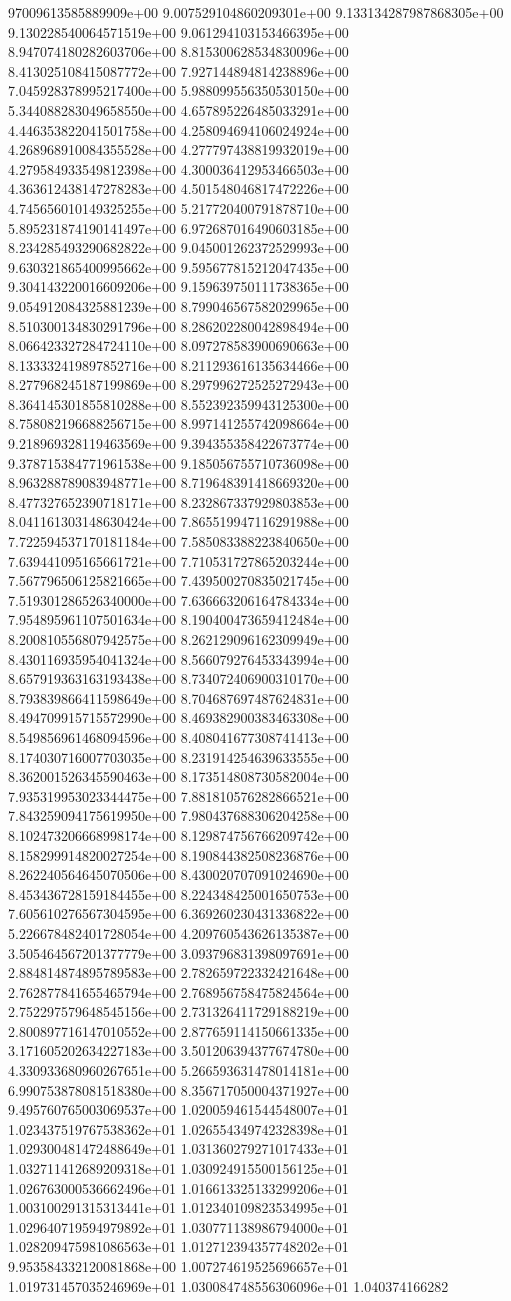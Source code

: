 97009613585889909e+00	9.007529104860209301e+00	9.133134287987868305e+00	9.130228540064571519e+00	9.061294103153466395e+00	8.947074180282603706e+00	8.815300628534830096e+00	8.413025108415087772e+00	7.927144894814238896e+00	7.045928378995217400e+00	5.988099556350530150e+00	5.344088283049658550e+00	4.657895226485033291e+00	4.446353822041501758e+00	4.258094694106024924e+00	4.268968910084355528e+00	4.277797438819932019e+00	4.279584933549812398e+00	4.300036412953466503e+00	4.363612438147278283e+00	4.501548046817472226e+00	4.745656010149325255e+00	5.217720400791878710e+00	5.895231874190141497e+00	6.972687016490603185e+00	8.234285493290682822e+00	9.045001262372529993e+00	9.630321865400995662e+00	9.595677815212047435e+00	9.304143220016609206e+00	9.159639750111738365e+00	9.054912084325881239e+00	8.799046567582029965e+00	8.510300134830291796e+00	8.286202280042898494e+00	8.066423327284724110e+00	8.097278583900690663e+00	8.133332419897852716e+00	8.211293616135634466e+00	8.277968245187199869e+00	8.297996272525272943e+00	8.364145301855810288e+00	8.552392359943125300e+00	8.758082196688256715e+00	8.997141255742098664e+00	9.218969328119463569e+00	9.394355358422673774e+00	9.378715384771961538e+00	9.185056755710736098e+00	8.963288789083948771e+00	8.719648391418669320e+00	8.477327652390718171e+00	8.232867337929803853e+00	8.041161303148630424e+00	7.865519947116291988e+00	7.722594537170181184e+00	7.585083388223840650e+00	7.639441095165661721e+00	7.710531727865203244e+00	7.567796506125821665e+00	7.439500270835021745e+00	7.519301286526340000e+00	7.636663206164784334e+00	7.954895961107501634e+00	8.190400473659412484e+00	8.200810556807942575e+00	8.262129096162309949e+00	8.430116935954041324e+00	8.566079276453343994e+00	8.657919363163193438e+00	8.734072406900310170e+00	8.793839866411598649e+00	8.704687697487624831e+00	8.494709915715572990e+00	8.469382900383463308e+00	8.549856961468094596e+00	8.408041677308741413e+00	8.174030716007703035e+00	8.231914254639633555e+00	8.362001526345590463e+00	8.173514808730582004e+00	7.935319953023344475e+00	7.881810576282866521e+00	7.843259094175619950e+00	7.980437688306204258e+00	8.102473206668998174e+00	8.129874756766209742e+00	8.158299914820027254e+00	8.190844382508236876e+00	8.262240564645070506e+00	8.430020707091024690e+00	8.453436728159184455e+00	8.224348425001650753e+00	7.605610276567304595e+00	6.369260230431336822e+00	5.226678482401728054e+00	4.209760543626135387e+00	3.505464567201377779e+00	3.093796831398097691e+00	2.884814874895789583e+00	2.782659722332421648e+00	2.762877841655465794e+00	2.768956758475824564e+00	2.752297579648545156e+00	2.731326411729188219e+00	2.800897716147010552e+00	2.877659114150661335e+00	3.171605202634227183e+00	3.501206394377674780e+00	4.330933680960267651e+00	5.266593631478014181e+00	6.990753878081518380e+00	8.356717050004371927e+00	9.495760765003069537e+00	1.020059461544548007e+01	1.023437519767538362e+01	1.026554349742328398e+01	1.029300481472488649e+01	1.031360279271017433e+01	1.032711412689209318e+01	1.030924915500156125e+01	1.026763000536662496e+01	1.016613325133299206e+01	1.003100291315313441e+01	1.012340109823534995e+01	1.029640719594979892e+01	1.030771138986794000e+01	1.028209475981086563e+01	1.012712394357748202e+01	9.953584332120081868e+00	1.007274619525696657e+01	1.019731457035246969e+01	1.030084748556306096e+01	1.040374166282